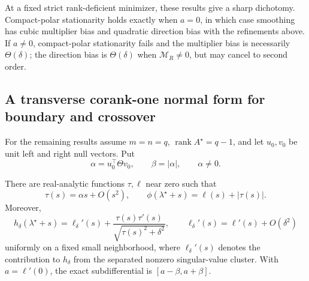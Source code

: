 At a fixed strict rank-deficient minimizer, these results give a sharp
dichotomy.  Compact-polar stationarity holds exactly when \(a=0\), in which
case smoothing has cubic multiplier bias and quadratic direction bias with
the refinements above.  If \(a\ne0\), compact-polar stationarity fails and the
multiplier bias is necessarily \(\Theta(\delta)\); the direction bias is
\(\Theta(\delta)\) when \(\mathcal M_R\ne0\), but may cancel to second order.

\subsection{A transverse corank-one normal form for boundary and crossover}

For the remaining results assume \(m=n=q\),
\(\operatorname{rank}A^\star=q-1\), and let \(u_0,v_0\) be unit left and
right null vectors.  Put
\begin{equation}
 \alpha=u_0^\top\Theta v_0,
 \qquad \beta=|\alpha|,
 \qquad \alpha\ne0.
 \label{eq:alpha-beta-main}
\end{equation}

\begin{lemma}
\label{lem:kink-normal-form}
There are real-analytic functions \(\tau,\ell\) near zero such that
\begin{equation}
 \tau(s)=\alpha s+O(s^2),
 \qquad
 \phi(\lambda^\star+s)=\ell(s)+|\tau(s)|.
 \label{eq:kink-normal-form}
\end{equation}
Moreover,
\begin{equation}
 h_\delta(\lambda^\star+s)
 =\ell_\delta'(s)
 +\frac{\tau(s)\tau'(s)}
       {\sqrt{\tau(s)^2+\delta^2}},
 \qquad
 \ell_\delta'(s)=\ell'(s)+O(\delta^2)
 \label{eq:kink-smooth-derivative}
\end{equation}
uniformly on a fixed small neighborhood, where \(\ell_\delta'(s)\) denotes the
contribution to \(h_\delta\) from the separated nonzero singular-value cluster.
With \(a=\ell'(0)\), the exact
subdifferential is \([a-\beta,a+\beta]\).
\end{lemma}

